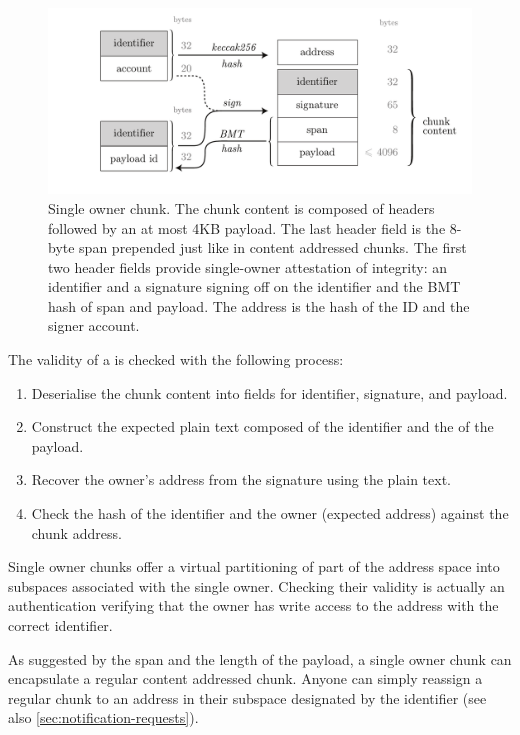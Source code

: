 \begin{figure}[htbp]
   \centering
   \includegraphics[width=\textwidth]{fig/single-owner-chunk.pdf}
   \caption[Single owner chunk\statusgreen]{Single owner chunk. The chunk content is composed of headers followed by an at most 4KB payload. The last header field is the 8-byte span prepended just like in content addressed chunks. The first two header fields provide single-owner attestation of integrity: an identifier and a signature signing off on the identifier and the BMT hash of span and payload. The address is the hash of the ID and the signer account.}
   \label{fig:single-owner-chunks}
\end{figure}

The validity of a  is checked with the following process:

\begin{enumerate}
    \item Deserialise the chunk content into fields for identifier, signature, and payload.
    \item Construct the expected plain text composed of the identifier and the  of the payload.
    \item Recover the owner's address from the signature using the plain text.
    \item Check the hash of the identifier and the owner (expected address) against the chunk address.
\end{enumerate}

Single owner chunks offer a virtual partitioning of part of the address space into subspaces associated with the single owner. Checking their validity is actually an authentication verifying that the owner has write access to the address with the correct identifier.

As suggested by the span and the length of the payload, a single owner chunk can encapsulate a regular content addressed chunk. Anyone can simply reassign a regular chunk to an address in their subspace designated by the identifier (see also \ref{sec:notification-requests}).


